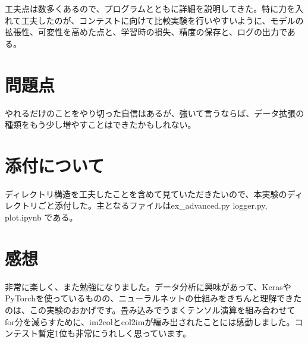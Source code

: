 \documentclass[platex,dvipdfmx]{jsarticle}
\begin{document}
工夫点は数多くあるので、プログラムとともに詳細を説明してきた。特に力を入れて工夫したのが、コンテストに向けて比較実験を行いやすいように、モデルの拡張性、可変性を高めた点と、学習時の損失、精度の保存と、ログの出力である。

\section{問題点}

やれるだけのことをやり切った自信はあるが、強いて言うならば、データ拡張の種類をもう少し増やすことはできたかもしれない。

\section{添付について}
ディレクトリ構造を工夫したことを含めて見ていただきたいので、本実験のディレクトリごと添付した。主となるファイルはex\_advanced.py logger.py, plot.ipynb である。

\section{感想}

非常に楽しく、また勉強になりました。データ分析に興味があって、KerasやPyTorchを使っているものの、ニューラルネットの仕組みをきちんと理解できたのは、この実験のおかげです。畳み込みでうまくテンソル演算を組み合わせてfor分を減らすために、im2colとcol2imが編み出されたことには感動しました。コンテスト暫定1位も非常にうれしく思っています。
\end{document}
